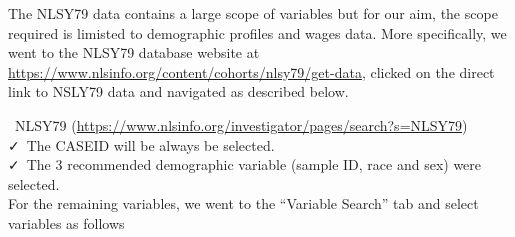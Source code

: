 \documentclass[12pt]{article}
\begin{document}
The NLSY79 data contains a large scope of variables but for our aim, the scope required is limisted to demographic profiles and wages data. More specifically, we went to the NLSY79 database website at \url{https://www.nlsinfo.org/content/cohorts/nlsy79/get-data}, clicked on the direct link to NSLY79 data and navigated as described below.

\begin{tcolorbox}[label="box:data", title=Navigating the data source to download the raw data]

\faDatabase~NLSY79 (\url{https://www.nlsinfo.org/investigator/pages/search?s=NLSY79})\\
\vspace{1mm}
\faCheck~The CASEID will be always be selected.\\
\vspace{1mm}
\faCheck~The 3 recommended demographic variable (sample ID, race and sex) were selected.\\
\vspace{1mm}
For the remaining variables, we went to the ``Variable Search'' tab and select variables as follows


\end{tcolorbox}
\end{document}
